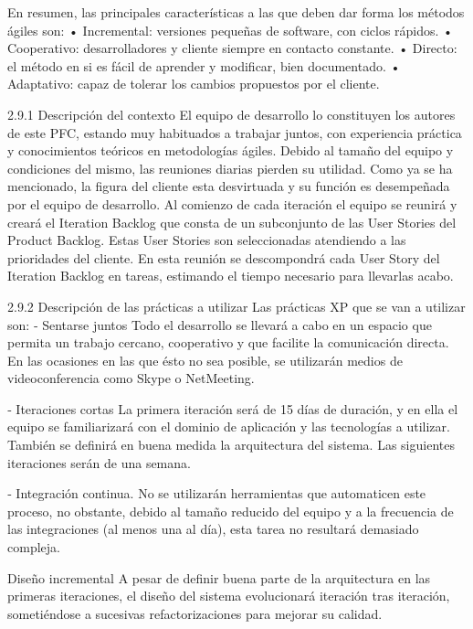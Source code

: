 En resumen, las principales características a las que deben dar forma los métodos ágiles son:
• Incremental: versiones pequeñas de software, con ciclos rápidos.
• Cooperativo: desarrolladores y cliente siempre en contacto constante.
• Directo: el método en si es fácil de aprender y modificar, bien documentado.
• Adaptativo: capaz de tolerar los cambios propuestos por el cliente.

2.9.1 Descripción del contexto 
El  equipo  de  desarrollo  lo  constituyen  los  autores  de  este  PFC,  estando  muy 
habituados  a  trabajar  juntos,  con  experiencia  práctica  y  conocimientos  teóricos  en 
metodologías  ágiles.    Debido  al  tamaño  del  equipo  y  condiciones  del  mismo,  las  reuniones 
diarias pierden su utilidad.  
Como ya se ha mencionado, la figura del cliente esta desvirtuada y su función es desempeñada 
por el equipo de desarrollo. 
 Al comienzo de cada iteración el equipo se reunirá y creará el Iteration Backlog que consta de 
un subconjunto de las User Stories del Product Backlog. Estas User Stories son seleccionadas 
atendiendo a las prioridades del cliente. En esta reunión se descompondrá cada User Story del 
Iteration Backlog en tareas, estimando el tiempo necesario para llevarlas acabo. 


2.9.2 Descripción de las prácticas a utilizar 
Las prácticas XP que se van a utilizar son: 
‐ Sentarse juntos 
Todo el desarrollo se llevará a cabo en un espacio que permita un trabajo cercano, cooperativo 
y  que  facilite  la  comunicación  directa.  En  las  ocasiones  en  las  que  ésto  no  sea  posible,  se 
utilizarán medios de videoconferencia como Skype o NetMeeting. 

‐ Iteraciones cortas 
La  primera  iteración  será  de  15  días  de  duración,  y    en  ella  el  equipo  se  familiarizará  con  el 
dominio  de  aplicación  y  las  tecnologías  a  utilizar.  También  se  definirá  en  buena  medida  la 
arquitectura del sistema.  
Las siguientes iteraciones serán de una semana. 
 
‐ Integración continua. 
No se utilizarán herramientas que automaticen este proceso, no obstante, debido al tamaño 
reducido del equipo y a la frecuencia de las integraciones (al menos una al día), esta tarea no 
resultará demasiado compleja. 

 Diseño incremental 
A  pesar  de  definir  buena  parte  de  la  arquitectura  en  las  primeras  iteraciones,  el  diseño  del 
sistema evolucionará iteración tras iteración, sometiéndose a sucesivas refactorizaciones para 
mejorar su calidad.  

